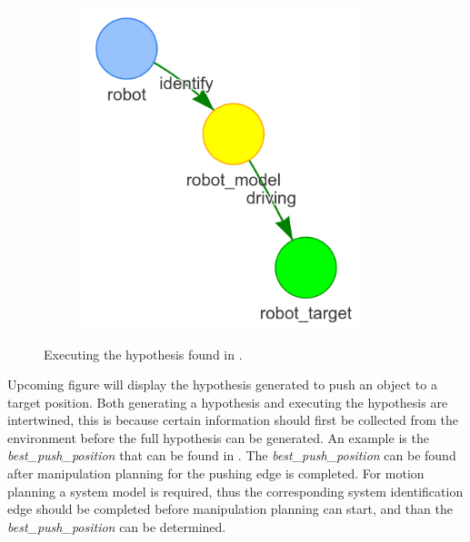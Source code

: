 \begin{figure}[H]
\begin{subfigure}{.3\textwidth}
    \end{subfigure}
    \begin{subfigure}{.3\textwidth}
    \centering
    \includegraphics[width=0.9\textwidth]{figures/proposed_method/connecting_nodes/robot_to_target/execute_robot_to_target_3}
    \end{subfigure}
    \caption{Executing the hypothesis found in .}
    \label{fig:execute_robot_to_target}
\end{figure}

Upcoming figure will display the hypothesis generated to push an object to a target position. Both generating a hypothesis and executing the hypothesis are intertwined, this is because certain information should first be collected from the environment before the full hypothesis can be generated. An example is the \textit{best\_push\_position} that can be found in . The \textit{best\_push\_position} can be found after manipulation planning for the pushing edge is completed. For motion planning a system model is required, thus the corresponding system identification edge should be completed before manipulation planning can start, and than the \textit{best\_push\_position} can be determined.\bs

